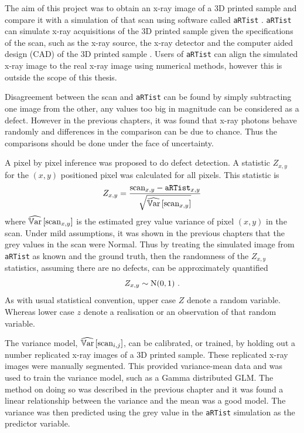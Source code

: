 The aim of this project was to obtain an x-ray image of a 3D printed sample and compare it with a simulation of that scan using software called \texttt{aRTist} \citep{bellon2007artist, jaenisch2008artist, bellon2012radiographic}. \texttt{aRTist} can simulate x-ray acquisitions of the 3D printed sample given the specifications of the scan, such as the x-ray source, the x-ray detector and the computer aided design (CAD) of the 3D printed sample \citep{bellon2011simulation, deresch2012simulating}. Users of \texttt{aRTist} can align the simulated x-ray image to the real x-ray image using numerical methods, however this is outside the scope of this thesis.

Disagreement between the scan and \texttt{aRTist} can be found by simply subtracting one image from the other, any values too big in magnitude can be considered as a defect. However in the previous chapters, it was found that x-ray photons behave randomly and differences in the comparison can be due to chance. Thus the comparisons should be done under the face of uncertainty.

A pixel by pixel inference was proposed to do defect detection. A statistic $Z_{x,y}$ for the $(x,y)$ positioned pixel was calculated for all pixels. This statistic is
\begin{equation}
  Z_{x,y} = 
  \dfrac{
    \text{scan}_{x,y} - \texttt{aRTist}_{x,y}
  }
  {
    \sqrt{\widehat{\operatorname{\mathbb{V}ar}}\left[\text{scan}_{x,y}\right]}
  }
\end{equation}
where $\widehat{\operatorname{\mathbb{V}ar}}\left[\text{scan}_{x,y}\right]$ is the estimated grey value variance of pixel $(x,y)$ in the scan. Under mild assumptions, it was shown in the previous chapters that the grey values in the scan were Normal. Thus by treating the simulated image from \texttt{aRTist} as known and the ground truth, then the randomness of the $Z_{x,y}$ statistics, assuming there are no defects, can be approximately quantified
\begin{equation}
Z_{x,y}\sim \normal(0,1) \ .
\end{equation}
As with usual statistical convention, upper case $Z$ denote a random variable. Whereas lower case $z$ denote a realisation or an observation of that random variable.

The variance model, $\widehat{\operatorname{\mathbb{V}ar}}\left[\text{scan}_{i,j}\right]$, can be calibrated, or trained, by holding out a number replicated x-ray images of a 3D printed sample. These replicated x-ray images were manually segmented. This provided variance-mean data and was used to train the variance model, such as a Gamma distributed GLM. The method on doing so was described in the previous chapter and it was found a linear relationship between the variance and the mean was a good model. The variance was then predicted using the grey value in the \texttt{aRTist} simulation as the predictor variable.

